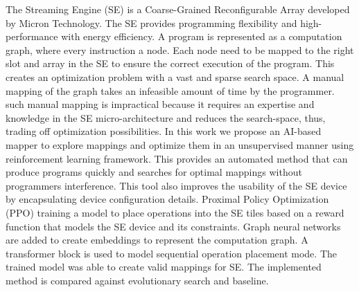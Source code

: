The Streaming Engine (SE) is a Coarse-Grained Reconfigurable Array developed by Micron 
Technology.
The SE provides programming flexibility and high-performance with energy efficiency.
A program is represented as a computation graph, where every instruction a node.
Each node need to be mapped to the right slot and array in the SE to ensure the correct execution of the program.
This creates an
 optimization problem with a vast and sparse search space.
A manual mapping of the graph takes an infeasible amount of time by the programmer.
such manual mapping is impractical because it requires an expertise and knowledge in the SE micro-architecture and reduces the search-space, thus, trading off optimization possibilities.
In this work we propose an AI-based mapper to explore mappings and optimize them in an unsupervised manner using reinforcement learning framework.
This provides an automated method that can produce programs quickly and searches for optimal mappings without programmers interference. 
This tool also improves the usability of the SE device by encapsulating device configuration details.
Proximal Policy Optimization (PPO) training a model to place operations into the SE tiles based on a reward function that models the SE device and its constraints.
Graph neural networks are added to create embeddings to represent the computation graph.
A transformer block is used to model sequential operation placement mode. 
The trained model was able to create valid mappings for SE.
The implemented method is compared against evolutionary search and baseline.